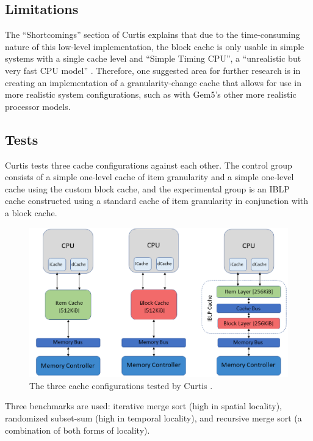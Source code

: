 \documentclass[12pt,twoside]{reedthesis}
\begin{document}
	\subsection*{Limitations}

	The ``Shortcomings'' section of Curtis explains that due to the time-consuming nature of this low-level implementation, the block cache is only usable in simple systems with a single cache level and ``Simple Timing CPU'', a ``unrealistic but very fast CPU model'' \cite{curtis}. Therefore, one suggested area for further research is in creating an implementation of a granularity-change cache that allows for use in more realistic system configurations, such as with Gem5's other more realistic processor models.

	\subsection*{Tests}

	Curtis tests three cache configurations against each other. The control group consists of a simple one-level cache of item granularity and a simple one-level cache using the custom block cache, and the experimental group is an IBLP cache constructed using a standard cache of item granularity in conjunction with a block cache.
	
	\vfill
	\begin{figure}[h]
		\centering
		\includegraphics[width=5in]{figures/curtis_caches.png}
		\caption{The three cache configurations tested by Curtis \cite{curtis}.}
	\end{figure}
	\vfill

	Three benchmarks are used: iterative merge sort (high in spatial locality), randomized subset-sum (high in temporal locality), and recursive merge sort (a combination of both forms of locality).
	
\end{document}

